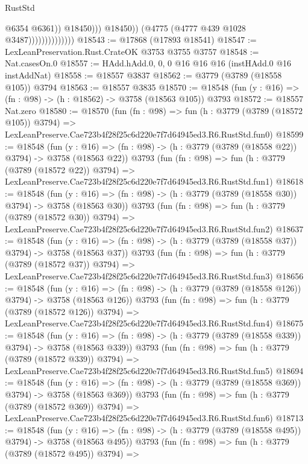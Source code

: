 \begin{lexlean}{RustStd}
\begin{coremodule}
                                          @6354
                                          @6361))
                                      @18450)))
                                @18450))
                            (@4775 (@4777 @439 @1028 @3487))))))))))))))
@18543 := @17868 (@17893 @18541)
@18547 := LexLeanPreservation.Rust.CrateOK @3753 @3755 @3757
@18548 := Nat.casesOn.{0}
@18557 := HAdd.hAdd.{0, 0, 0} @16 @16 @16 (instHAdd.{0} @16 instAddNat)
@18558 := @18557 @3837
@18562 := @3779 (@3789 (@18558 @105)) @3794
@18563 := @18557 @3835
@18570 := @18548 (fun (y : @16) => (fn : @98) -> (h : @18562) -> @3758 (@18563 @105)) @3793
@18572 := @18557 Nat.zero
@18580 := @18570
    (fun (fn : @98) =>
    fun (h : @3779 (@3789 (@18572 @105)) @3794) =>
    LexLeanPreserve.Cae723b4f28f25c6d220e7f7d64945ed3.R6.RustStd.fun0)
@18599 := @18548
    (fun (y : @16) => (fn : @98) -> (h : @3779 (@3789 (@18558 @22)) @3794) -> @3758 (@18563 @22))
    @3793
    (fun (fn : @98) =>
    fun (h : @3779 (@3789 (@18572 @22)) @3794) =>
    LexLeanPreserve.Cae723b4f28f25c6d220e7f7d64945ed3.R6.RustStd.fun1)
@18618 := @18548
    (fun (y : @16) => (fn : @98) -> (h : @3779 (@3789 (@18558 @30)) @3794) -> @3758 (@18563 @30))
    @3793
    (fun (fn : @98) =>
    fun (h : @3779 (@3789 (@18572 @30)) @3794) =>
    LexLeanPreserve.Cae723b4f28f25c6d220e7f7d64945ed3.R6.RustStd.fun2)
@18637 := @18548
    (fun (y : @16) => (fn : @98) -> (h : @3779 (@3789 (@18558 @37)) @3794) -> @3758 (@18563 @37))
    @3793
    (fun (fn : @98) =>
    fun (h : @3779 (@3789 (@18572 @37)) @3794) =>
    LexLeanPreserve.Cae723b4f28f25c6d220e7f7d64945ed3.R6.RustStd.fun3)
@18656 := @18548
    (fun (y : @16) => (fn : @98) -> (h : @3779 (@3789 (@18558 @126)) @3794) -> @3758 (@18563 @126))
    @3793
    (fun (fn : @98) =>
    fun (h : @3779 (@3789 (@18572 @126)) @3794) =>
    LexLeanPreserve.Cae723b4f28f25c6d220e7f7d64945ed3.R6.RustStd.fun4)
@18675 := @18548
    (fun (y : @16) => (fn : @98) -> (h : @3779 (@3789 (@18558 @339)) @3794) -> @3758 (@18563 @339))
    @3793
    (fun (fn : @98) =>
    fun (h : @3779 (@3789 (@18572 @339)) @3794) =>
    LexLeanPreserve.Cae723b4f28f25c6d220e7f7d64945ed3.R6.RustStd.fun5)
@18694 := @18548
    (fun (y : @16) => (fn : @98) -> (h : @3779 (@3789 (@18558 @369)) @3794) -> @3758 (@18563 @369))
    @3793
    (fun (fn : @98) =>
    fun (h : @3779 (@3789 (@18572 @369)) @3794) =>
    LexLeanPreserve.Cae723b4f28f25c6d220e7f7d64945ed3.R6.RustStd.fun6)
@18713 := @18548
    (fun (y : @16) => (fn : @98) -> (h : @3779 (@3789 (@18558 @495)) @3794) -> @3758 (@18563 @495))
    @3793
    (fun (fn : @98) =>
    fun (h : @3779 (@3789 (@18572 @495)) @3794) =>

\end{coremodule}
\end{lexlean}
